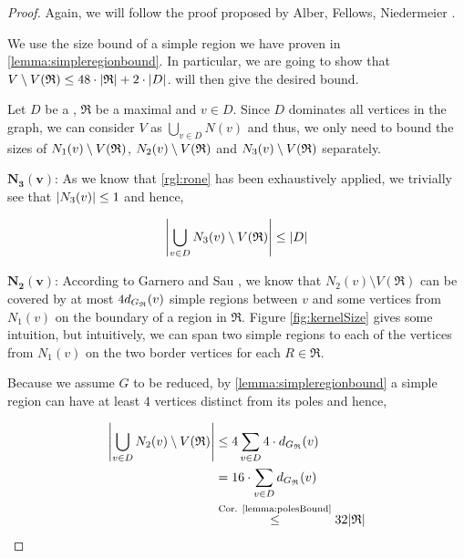 \begin{proof}
    Again, we will follow the proof proposed by Alber, Fellows, Niedermeier \cite[Proposition 2]{Alber2004}. 
    
    We use the size bound of a simple region we have proven in \cref{lemma:simpleregionbound}. In particular, we are going to show that $V \setminus V(\mathfrak{R}) \leq 48 \cdot \abs{\mathfrak{R}} + 2 \cdot \abs{D}$.  will then give the desired bound.
    
    Let $D$ be a \sdom, $\mathfrak{R}$ be a maximal \dreg and $v \in D$. Since $D$ dominates all vertices in the graph, we can consider $V$ as $\bigcup_{v \in D}N(v)$ and thus, we only need to bound the sizes of $N_1(v)\setminus {V(\mathfrak{R})} $, $N_2(v) \setminus {V(\mathfrak{R})} $ and $N_3(v) \setminus {V(\mathfrak{R})} $ separately.
    
    \noindent$\mathbf{N_3(v)}$: As we know that \cref{rgl:rone} has been exhaustively applied, we trivially see that $\abs{N_3(v)} \leq 1$ and hence, 
    
    \[\abs{\bigcup_{v \in D}N_3(v) \setminus V(\mathfrak{R})} \leq \abs{D}\]
    
    \noindent$\mathbf{N_2(v)}$: According to Garnero and Sau \cite[Proposition 2]{Garnero2018}, we know that $N_2(v) \setminus V(\mathfrak{R})$ can be covered by at most $4 d_{G_{\mathfrak{R}}}(v)$ simple regions between $v$ and some vertices from $N_1(v)$ on the boundary of a region in $\mathfrak{R}$. Figure \ref{fig:kernelSize} gives some intuition, but intuitively, we can span two simple regions to each of the vertices from $N_1(v)$ on the two border vertices for each $R \in \mathfrak{R}$.
    
    Because we assume $G$ to be reduced, by \cref{lemma:simpleregionbound} a simple region can have at least $4$ vertices distinct from its poles and hence,
    
    \begin{equation}
        \begin{split}
            \abs{\bigcup_{v \in D} N_2(v) \setminus V(\mathfrak{R})} &\leq 4 \sum_{v \in D}4 \cdot d_{G_{\mathfrak{R}}}(v) \\
            &= 16 \cdot \sum_{v \in D}d_{G_{\mathfrak{R}}}(v) \\
            &\overset{\text{Cor. \ref{lemma:polesBound}}}{\leq} 32 \abs{\mathfrak{R}}
        \end{split}
    \end{equation}
    
    
    

\end{proof}

